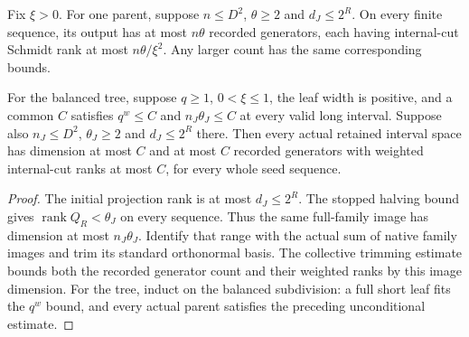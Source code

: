 \begin{lemma}
    \label{lem:actual_interval_resampling_tree_profile}
    \leanok
    Fix $\xi>0$. For one parent, suppose $n\le D^2$, $\theta\ge2$ and
    $d_J\le2^R$. On every finite sequence, its output has at most
    $n\theta$ recorded generators, each having internal-cut Schmidt rank
    at most $n\theta/\xi^2$. Any larger count has the same corresponding
    bounds.

    For the balanced tree, suppose $q\ge1$, $0<\xi\le1$, the leaf width
    is positive, and a common $C$ satisfies $q^w\le C$ and
    $n_J\theta_J\le C$ at every valid long interval. Suppose also
    $n_J\le D^2$, $\theta_J\ge2$ and $d_J\le2^R$ there. Then every actual
    retained interval space has dimension at most $C$ and at most $C$
    recorded generators with weighted internal-cut ranks at most $C$,
    for every whole seed sequence.
\end{lemma}
\begin{proof}\leanok
    The initial projection rank is at most $d_J\le2^R$. The stopped
    halving bound gives $\operatorname{rank}Q_R<\theta_J$ on every
    sequence. Thus the same full-family image has dimension at most
    $n_J\theta_J$. Identify that range with the actual sum of native
    family images and trim its standard orthonormal basis. The collective
    trimming estimate bounds both the recorded generator count and their
    weighted ranks by this image dimension. For the tree, induct on the
    balanced subdivision: a full short leaf fits the $q^w$ bound, and
    every actual parent satisfies the preceding unconditional estimate.
\end{proof}
